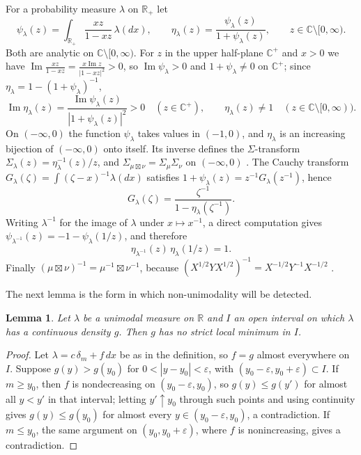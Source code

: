 \documentclass[11pt]{amsart}
\newtheorem{lemma}[theorem]{Lemma}
\theoremstyle{remark}
\newcommand{\R}{\mathbb R}
\newcommand{\C}{\mathbb C}
\newcommand{\Rp}{\R_{+}}
\newcommand{\CH}{\C^{+}}
\begin{document}
For a probability measure $\lambda$ on $\Rp$ let
\[
\psi_\lambda(z)=\int_{\Rp}\frac{xz}{1-xz}\,\lambda(dx),\qquad \eta_\lambda(z)=\frac{\psi_\lambda(z)}{1+\psi_\lambda(z)},\qquad z\in\C\setminus[0,\infty).
\]
Both are analytic on $\C\setminus[0,\infty)$. For $z$ in the upper half-plane $\CH$ and $x>0$ we have $\operatorname{Im}\frac{xz}{1-xz}=\frac{x\operatorname{Im}z}{|1-xz|^2}>0$, so $\operatorname{Im}\psi_\lambda>0$ and $1+\psi_\lambda\ne0$ on $\CH$; since $\eta_\lambda=1-(1+\psi_\lambda)^{-1}$,
\begin{equation}\label{eq:etaH}
\operatorname{Im}\eta_\lambda(z)=\frac{\operatorname{Im}\psi_\lambda(z)}{|1+\psi_\lambda(z)|^2}>0\quad(z\in\CH),\qquad \eta_\lambda(z)\ne1\quad(z\in\C\setminus[0,\infty)).
\end{equation}
On $(-\infty,0)$ the function $\psi_\lambda$ takes values in $(-1,0)$, and $\eta_\lambda$ is an increasing bijection of $(-\infty,0)$ onto itself. Its inverse defines the $\Sigma$-transform $\Sigma_\lambda(z)=\eta_\lambda^{-1}(z)/z$, and $\Sigma_{\mu\boxtimes\nu}=\Sigma_\mu\Sigma_\nu$ on $(-\infty,0)$ \cite{Voi87,BV93}. The Cauchy transform $G_\lambda(\zeta)=\int(\zeta-x)^{-1}\lambda(dx)$ satisfies $1+\psi_\lambda(z)=z^{-1}G_\lambda(z^{-1})$, hence
\begin{equation}\label{eq:G}
G_\lambda(\zeta)=\frac{\zeta^{-1}}{1-\eta_\lambda(\zeta^{-1})}.
\end{equation}
Writing $\lambda^{-1}$ for the image of $\lambda$ under $x\mapsto x^{-1}$, a direct computation gives $\psi_{\lambda^{-1}}(z)=-1-\psi_\lambda(1/z)$, and therefore
\begin{equation}\label{eq:inv}
\eta_{\lambda^{-1}}(z)\,\eta_\lambda(1/z)=1 .
\end{equation}
Finally $(\mu\boxtimes\nu)^{-1}=\mu^{-1}\boxtimes\nu^{-1}$, because $(X^{1/2}YX^{1/2})^{-1}=X^{-1/2}Y^{-1}X^{-1/2}$ \cite[Section~4]{HUW}.

The next lemma is the form in which non-unimodality will be detected.

\begin{lemma}\label{lem:nomin}
Let $\lambda$ be a unimodal measure on $\R$ and $I$ an open interval on which $\lambda$ has a continuous density $g$. Then $g$ has no strict local minimum in $I$.
\end{lemma}

\begin{proof}
Let $\lambda=c\,\delta_m+f\,dx$ be as in the definition, so $f=g$ almost everywhere on $I$. Suppose $g(y)>g(y_0)$ for $0<|y-y_0|<\varepsilon$, with $(y_0-\varepsilon,y_0+\varepsilon)\subset I$. If $m\ge y_0$, then $f$ is nondecreasing on $(y_0-\varepsilon,y_0)$, so $g(y)\le g(y')$ for almost all $y<y'$ in that interval; letting $y'\uparrow y_0$ through such points and using continuity gives $g(y)\le g(y_0)$ for almost every $y\in(y_0-\varepsilon,y_0)$, a contradiction. If $m\le y_0$, the same argument on $(y_0,y_0+\varepsilon)$, where $f$ is nonincreasing, gives a contradiction.
\end{proof}
\end{document}
